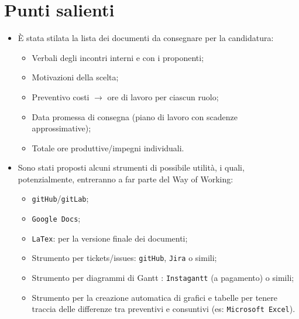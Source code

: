 \documentclass[11pt]{article}
\begin{document}
	\newpage

	\section{Punti salienti}
		\begin{itemize}
			\item È stata stilata la lista dei documenti da consegnare per la candidatura:
				\begin{itemize}
					\item Verbali degli incontri interni e con i proponenti;
					\item Motivazioni della scelta;
					\item Preventivo costi $\rightarrow$ ore di lavoro per ciascun ruolo;
					\item Data promessa di consegna (piano di lavoro con scadenze approssimative);
					\item Totale ore produttive/impegni individuali.
				\end{itemize}
			\item Sono stati proposti alcuni strumenti di possibile utilità, i quali, potenzialmente, entreranno a far parte
			del Way of Working:
				\begin{itemize}
					\item \texttt{gitHub}/\texttt{gitLab};
					\item \texttt{Google Docs};
					\item \texttt{LaTex}: per la versione finale dei documenti;
					\item Strumento per tickets/issues: \texttt{gitHub}, \texttt{Jira} o simili;
					\item Strumento per diagrammi di Gantt : \texttt{Instagantt} (a pagamento) o simili;
					\item Strumento per la creazione automatica di grafici e tabelle per tenere traccia delle differenze
					tra preventivi e consuntivi (es: \texttt{Microsoft Excel}).
				\end{itemize}
		\end{itemize}
		
		
		
		
		
		
		
		
		
		
		
		
		
		
		
\end{document}
